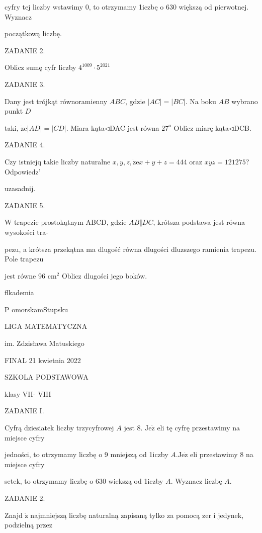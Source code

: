 \documentclass[a4paper,12pt]{article}
\begin{document}
cyfry tej liczby wstawimy 0, to otrzymamy 1iczbę o 630 większą od pierwotnej. Wyznacz

początkową liczbę.

ZADANIE 2.

Oblicz sumę cyfr liczby $4^{1009}\cdot 5^{2021}$

ZADANIE 3.

Dany jest trójkąt równoramienny $ABC$, gdzie $|AC| = |BC|$. Na boku $AB$ wybrano punkt $D$

taki, $\dot{\mathrm{z}}\mathrm{e}|AD|=|CD|$. Miara kąta$\triangleleft$DAC jest równa $27^{\mathrm{o}}$ Oblicz miarę kąta$\triangleleft$DCB.

ZADANIE 4.

Czy istniejq takie liczby naturalne $x, y, z, \dot{\mathrm{z}}\mathrm{e}x+y+z=444$ oraz $xyz=121275$? Odpowiedz'

uzasadnij.

ZADANIE 5.

$\mathrm{W}$ trapezie prostokątnym ABCD, gdzie $AB\Vert DC$, krótsza podstawa jest równa wysokości tra-

pezu, a krótsza przekątna ma dlugość równa dlugości dluzszego ramienia trapezu. Pole trapezu

jest równe 96 $\mathrm{c}\mathrm{m}^{2}$ Oblicz dlugości jego boków.






flkademia

P omorskamStupsku

LIGA MATEMATYCZNA

im. Zdzisława Matuskiego

FINAL 21 kwietnia 2022

SZKOLA PODSTAWOWA

klasy VII- VIII

ZADANIE I.

Cyfrą dziesiatek liczby trzycyfrowej $A$ jest 8. $\mathrm{J}\mathrm{e}\dot{\mathrm{z}}$ eli tę cyfrę przestawimy na miejsce cyfry

jedności, to otrzymamy liczbę o 9 mniejszą od 1iczby $A. \mathrm{J}\mathrm{e}\dot{\mathrm{z}}$ eli przestawimy 8 na miejsce cyfry

setek, to otrzymamy liczbę o 630 wiekszą od 1iczby $A$. Wyznacz liczbę $A.$

ZADANIE 2.

Znajd $\acute{\mathrm{z}}$ najmniejszą liczbę naturalną zapisaną tylko za pomocą zer i jedynek, podzielną przez
\end{document}
